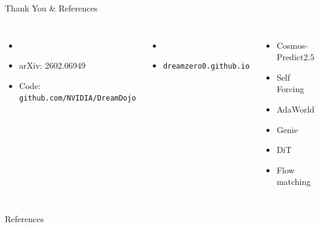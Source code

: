 \begin{frame}{Thank You \& References}
\begin{columns}[T]
\begin{itemize}
    \item \citet{gao2026dreamdojo}
    \item arXiv: 2602.06949
    \item Code: \texttt{github.com/NVIDIA/DreamDojo}
\end{itemize}

\vspace{0.3em}
\begin{itemize}
    \item \citet{ye2026dreamzero}
    \item \texttt{dreamzero0.github.io}
\end{itemize}

\begin{itemize}
    \item Cosmos-Predict2.5 \citep{ali2025world}
    \item Self Forcing \citep{huang2025self}
    \item AdaWorld \citep{gao2025adaworld}
    \item Genie \citep{bruce2024genie}
    \item DiT \citep{peebles2023scalable}
    \item Flow matching \citep{lipman2022flow}
\end{itemize}
\end{columns}

\vspace{0.5em}
\begin{center}
\Large{}
\end{center}
\end{frame}

\begin{frame}[allowframebreaks]{References}
\printbibliography[heading=none]
\end{frame}


